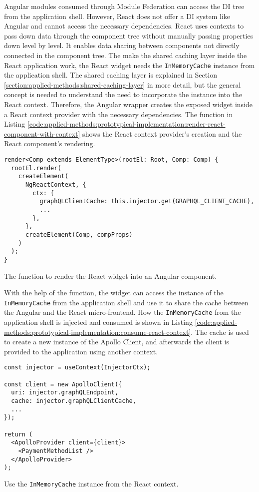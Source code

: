 \noindent Angular modules consumed through Module Federation can access the \ac{DI} tree from the application shell. However, React does not offer a \ac{DI} system like Angular and cannot access the necessary dependencies. React uses contexts to pass down data through the component tree without manually passing properties down level by level. It enables data sharing between components not directly connected in the component tree. The make the shared caching layer inside the React application work, the React widget needs the \texttt{InMemoryCache} instance from the application shell. The shared caching layer is explained in Section \ref{section:applied-methods:shared-caching-layer} in more detail, but the general concept is needed to understand the need to incorporate the instance into the React context. Therefore, the Angular wrapper creates the exposed widget inside a React context provider with the necessary dependencies. The function in Listing \ref{code:applied-methods:prototypical-implementation:render-react-component-with-context} shows the React context provider's creation and the React component's rendering. 

\ifshowListings
\begin{listing}[H]
    \begin{verbatim}
render<Comp extends ElementType>(rootEl: Root, Comp: Comp) {
  rootEl.render(
    createElement(
      NgReactContext, {
        ctx: {
          graphQLClientCache: this.injector.get(GRAPHQL_CLIENT_CACHE),
          ...
        },
      },
      createElement(Comp, compProps)
    )
  );
}
    \end{verbatim}
    \caption{The function to render the React widget into an Angular component.}\label{code:applied-methods:prototypical-implementation:render-react-component-with-context}
\end{listing}
\fi

\noindent With the help of the function, the widget can access the instance of the \texttt{InMemoryCache} from the application shell and use it to share the cache between the Angular and the React micro-frontend. How the \texttt{InMemoryCache} from the application shell is injected and consumed is shown in Listing \ref{code:applied-methods:prototypical-implementation:consume-react-context}. The cache is used to create a new instance of the Apollo Client, and afterwards the client is provided to the application using another context.

\ifshowListings
\begin{listing}[H]
    \begin{verbatim}
const injector = useContext(InjectorCtx);

const client = new ApolloClient({
  uri: injector.graphQLEndpoint,
  cache: injector.graphQLClientCache,
  ...
});

return (
  <ApolloProvider client={client}>
    <PaymentMethodList />
  </ApolloProvider>
);

    \end{verbatim}
    \caption{Use the \texttt{InMemoryCache} instance from the React context.}\label{code:applied-methods:prototypical-implementation:consume-react-context}
\end{listing}
\fi
